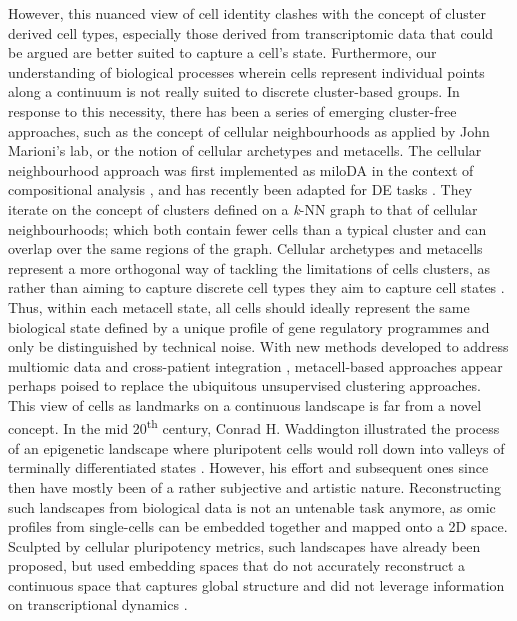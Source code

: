 However, this nuanced view of cell identity clashes with the concept of cluster derived cell types, especially those derived from transcriptomic data that could be argued are better suited to capture a cell's state. Furthermore, our understanding of biological processes wherein cells represent individual points along a continuum is not really suited to discrete cluster-based groups. In response to this necessity, there has been a series of emerging cluster-free approaches, such as the concept of cellular neighbourhoods as applied by John Marioni's lab, or the notion of cellular archetypes and metacells. The cellular neighbourhood approach was first implemented as miloDA in the context of compositional analysis \cite{dann_differential_2022}, and has recently been adapted for DE tasks \cite{missarova_sensitive_2023}. They iterate on the concept of clusters defined on a \textit{k}-NN graph to that of cellular neighbourhoods; which both contain fewer cells than a typical cluster and can overlap over the same regions of the graph. Cellular archetypes and metacells represent a more orthogonal way of tackling the limitations of cells clusters, as rather than aiming to capture discrete cell types they aim to capture cell states \cite{baran_metacell_2019, wang_non-linear_2022}. Thus, within each metacell state, all cells should ideally represent the same biological state defined by a unique profile of gene regulatory programmes and only be distinguished by technical noise. With new methods developed to address multiomic data and cross-patient integration \cite{persad_seacells_2023}, metacell-based approaches appear perhaps poised to replace the ubiquitous unsupervised clustering approaches.  
This view of cells as landmarks on a continuous landscape is far from a novel concept. In the mid 20\textsuperscript{th} century, Conrad H. Waddington illustrated the process of an epigenetic landscape where pluripotent cells would roll down into valleys of terminally differentiated states \cite{ch_waddington_waddington_1957}. However, his effort and subsequent ones since then have mostly been of a rather subjective and artistic nature. Reconstructing such landscapes from biological data is not an untenable task anymore, as omic profiles from single-cells can be embedded together and mapped onto a 2D space. Sculpted by cellular pluripotency metrics, such landscapes have already been proposed, but used embedding spaces that do not accurately reconstruct a continuous space that captures global structure and did not leverage information on transcriptional dynamics \cite{chen_single-cell_2019}. 

